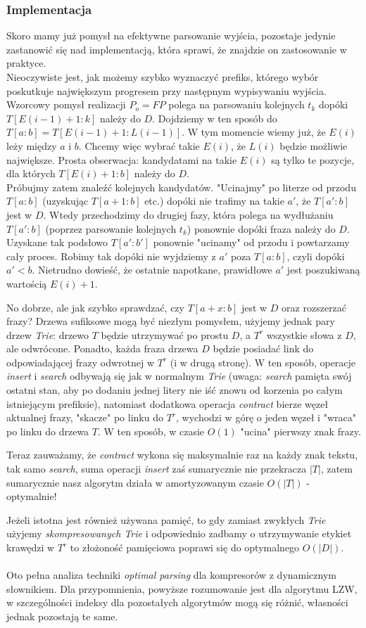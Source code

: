 \subsubsection{Implementacja}
Skoro mamy już pomysł na efektywne parsowanie wyjścia, pozostaje jedynie zastanowić się nad implementacją, która sprawi, że znajdzie on zastosowanie w praktyce.\\
Nieoczywiste jest, jak możemy szybko wyznaczyć prefiks, którego wybór poskutkuje największym progresem przy następnym wypisywaniu wyjścia. Wzorcowy pomysł realizacji $P_{o}=FP$ polega na parsowaniu kolejnych $t_{k}$ dopóki $T[E(i-1)+1:k]$ należy do $D$. Dojdziemy w ten sposób do $T[a:b]=T[E(i-1)+1:L(i-1)]$. W tym momencie wiemy już, że $E(i)$ leży między $a$ i $b$. Chcemy więc wybrać takie $E(i)$, że $L(i)$ będzie możliwie największe. Prosta obserwacja: kandydatami na takie $E(i)$ są tylko te pozycje, dla których $T[E(i)+1:b]$ należy do $D$.\\
Próbujmy zatem znaleźć kolejnych kandydatów. "Ucinajmy" po literze od przodu $T[a:b]$ (uzyskując $T[a+1:b]$ etc.) dopóki nie trafimy na takie $a'$, że $T[a':b]$ jest w $D$. Wtedy przechodzimy do drugiej fazy, która polega na wydłużaniu $T[a':b]$ (poprzez parsowanie kolejnych $t_{k}$) ponownie dopóki fraza należy do $D$. Uzyskane tak podsłowo $T[a':b']$ ponownie "ucinamy" od przodu i powtarzamy cały proces. Robimy tak dopóki nie wyjdziemy z $a'$ poza $T[a:b]$, czyli dopóki $a' < b$. Nietrudno dowieść, że ostatnie napotkane, prawidłowe $a'$ jest poszukiwaną wartością $E(i)+1$.

No dobrze, ale jak szybko sprawdzać, czy $T[a+x:b]$ jest w $D$ oraz rozszerzać frazy? Drzewa sufiksowe mogą być niezłym pomysłem, użyjemy jednak pary drzew \textit{Trie}: drzewo $T$ będzie utrzymywać po prostu $D$, a $T^{r}$ wszystkie słowa z $D$, ale odwrócone. Ponadto, każda fraza drzewa $D$ będzie posiadać link do odpowiadającej frazy odwrotnej w $T^{r}$ (i w drugą stronę).
W ten sposób, operacje \textit{insert} i \textit{search} odbywają się jak w normalnym \textit{Trie} (uwaga: \textit{search} pamięta swój ostatni stan, aby po dodaniu jednej litery nie iść znowu od korzenia po całym istniejącym prefiksie), natomiast dodatkowa operacja \textit{contract} bierze węzeł aktualnej frazy, "skacze" po linku do $T^{r}$, wychodzi w górę o jeden węzeł i "wraca" po linku do drzewa $T$. W ten sposób, w czasie $O(1)$ "ucina" pierwszy znak frazy.

Teraz zauważamy, że \textit{contract} wykona się maksymalnie raz na każdy znak tekstu, tak samo \textit{search}, suma operacji \textit{insert} zaś sumarycznie nie przekracza $|T|$, zatem sumarycznie nasz algorytm działa w amortyzowanym czasie $O(|T|)$ - optymalnie!

Jeżeli istotna jest również używana pamięć, to gdy zamiast zwykłych \textit{Trie} użyjemy \textit{skompresowanych Trie} i odpowiednio zadbamy o utrzymywanie etykiet krawędzi w $T^{r}$ to złożoność pamięciowa poprawi się do optymalnego $O(|D|)$.\\
\\
Oto pełna analiza techniki \textit{optimal parsing} dla kompresorów z dynamicznym słownikiem. Dla przypomnienia, powyższe rozumowanie jest dla algorytmu LZW, w szczególności indeksy dla pozostałych algorytmów mogą się różnić, własności jednak pozostają te same.
